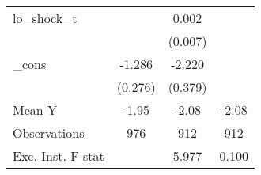 {\begin{tabular}{l*{3}{c}}
\addlinespace
lo\_shock\_t  &                     &       0.002         &                     \\
            &                     &     (0.007)         &                     \\
\addlinespace
\_cons      &      -1.286\sym{***}&      -2.220\sym{***}&                     \\
            &     (0.276)         &     (0.379)         &                     \\
\midrule
Mean Y      &       -1.95         &       -2.08         &       -2.08         \\
Observations&         976         &         912         &         912         \\
Exc. Inst. F-stat&                     &       5.977         &       0.100         \\
\bottomrule
\end{tabular}
}
